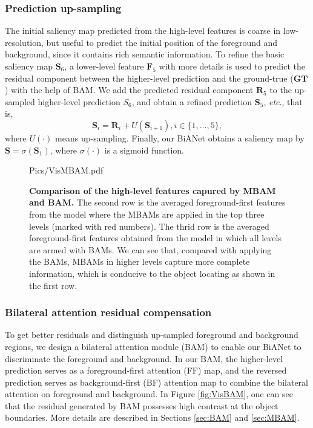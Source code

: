\documentclass[journal]{IEEEtran}
\def\etc{\emph{etc}}
\newcommand{\figref}[1]{Figure \ref{#1}}
\begin{document}
\subsubsection{Prediction up-sampling}
The initial saliency map predicted from the high-level features is coarse in low-resolution, but useful to predict the initial position of the foreground and background, since it contains rich semantic information.
To refine the basic saliency map $\mathbf{S}_6$, a lower-level feature $\mathbf{F}_5$ with more details is used to predict the residual component between the higher-level prediction and the ground-true ($\mathbf{GT}$) with the help of BAM.
We add the predicted residual component $\mathbf{R}_5$ to the up-sampled higher-level prediction $S_6$, and obtain a refined prediction $\mathbf{S}_5$, \etc., that is,
\begin{equation}
\mathbf{S}_i = \mathbf{R}_i + U(\mathbf{S}_{i+1}), i\in\{1,\dots,5\},
\label{equ:up}
\end{equation}
where $U(\cdot)$ means up-sampling.
Finally, our BiANet obtains a saliency map by $\mathbf{S}=\sigma(\mathbf{S}_1)$, where $\sigma(\cdot)$ is a sigmoid function.

\begin{figure}[t]
	\centering
	\begin{overpic}[width=.98\columnwidth]{Pics/VisMBAM.pdf} 
	\end{overpic}
\caption{
		\textbf{Comparison of the high-level features capured by MBAM and BAM.}
		The second row is the averaged foreground-first features from the model where the MBAMs are applied in the top three levels (marked with red numbers).
		The thrid row is the averaged foreground-first features obtained from the model in which all levels are armed with BAMs.
		We can see that, compared with applying the BAMs, MBAMs in higher levels capture more complete information, 
		which is conducive to the object locating as shown in the first row.
	}
	\vspace{-8pt}
	\label{fig:VisMBAM}
\end{figure}


\subsubsection{Bilateral attention residual compensation}
To get better residuals and distinguish up-sampled foreground and background regions, we design a bilateral attention module (BAM) to enable our BiANet to discriminate the foreground and background.
In our BAM, the higher-level prediction serves as a foreground-first attention (FF) map, 
and the reversed prediction serves as background-first (BF) attention map to combine the bilateral attention on foreground and background.
In \figref{fig:VisBAM}, one can see that the residual generated by BAM possesses high contrast at the object boundaries.
More details are described in Sections \ref{sec:BAM} and \ref{sec:MBAM}.
\end{document}
